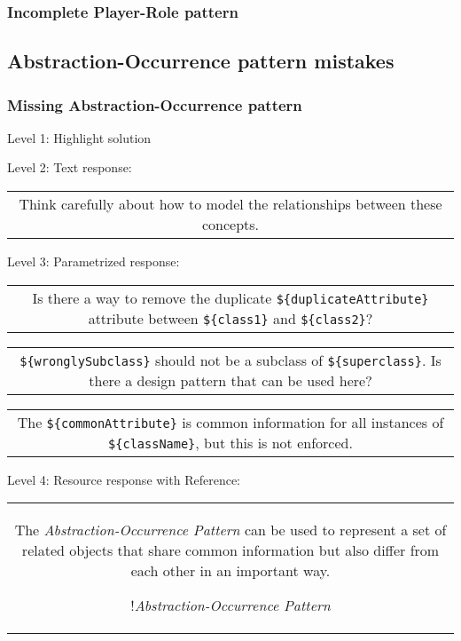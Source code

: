 \subsubsection{Incomplete Player-Role pattern}


\subsection{Abstraction-Occurrence pattern mistakes}

\subsubsection{Missing Abstraction-Occurrence pattern}

\noindent Level 1: Highlight solution \medskip

\noindent Level 2: Text response: \medskip

\begin{tabular}{|c}
Think carefully about how to model the relationships between these concepts.
\end{tabular} \medskip

\noindent Level 3: Parametrized response: \medskip

\begin{tabular}{|c}
Is there a way to remove the duplicate \verb|${duplicateAttribute}| attribute between \verb|${class1}| and \verb|${class2}|?
\end{tabular} \medskip

\begin{tabular}{|c}
\verb|${wronglySubclass}| should not be a subclass of \verb|${superclass}|. Is there a design pattern that can be used here?
\end{tabular} \medskip

\begin{tabular}{|c}
The \verb|${commonAttribute}| is common information for all instances of \verb|${className}|, but this is not enforced.
\end{tabular} \medskip

\noindent Level 4: Resource response with Reference:

\begin{tabular}{|c}
The \textit{Abstraction-Occurrence Pattern} can be used to 
represent a set of related objects that share common information but also differ
from each other in an important way.

!\textit{Abstraction-Occurrence Pattern}
\end{tabular} \medskip


